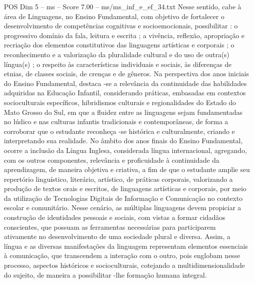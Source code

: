 \begin{textsample}{POS Dim 5 – ms – Score 7.00 – ms/ms\_inf\_e\_ef\_34.txt}
Nesse sentido, cabe à área de Linguagens, no Ensino Fundamental, com objetivo de fortalecer o desenvolvimento de competências cognitivas e socioemocionais, possibilitar : o progressivo domínio da fala, leitura e escrita ; a vivência, reflexão, apropriação e recriação dos elementos constitutivos das linguagens artísticas e corporais ; o reconhecimento e a valorização da pluralidade cultural e do uso de outra(s) língua(s) ; o respeito às características individuais e sociais, às diferenças de etnias, de classes sociais, de crenças e de gêneros.
Na perspectiva dos anos iniciais do Ensino Fundamental, destaca -se a relevância da continuidade das habilidades adquiridas na Educação Infantil, considerando práticas, embasadas em contextos socioculturais específicos, hibridismos culturais e regionalidades do Estado do Mato Grosso do Sul, em que a fluidez entre as linguagens sejam fundamentadas no lúdico e nas culturas infantis tradicionais e contemporâneas, de forma a corroborar que o estudante reconheça -se histórica e culturalmente, criando e interpretando sua realidade.
No âmbito dos anos finais do Ensino Fundamental, ocorre a inclusão da Língua Inglesa, considerada língua internacional, agregando, com os outros componentes, relevância e proficuidade à continuidade da aprendizagem, de maneira objetiva e criativa, a fim de que o estudante amplie seu repertório linguístico, literário, artístico, de práticas corporais, valorizando a produção de textos orais e escritos, de linguagens artísticas e corporais, por meio da utilização de Tecnologias Digitais de Informação e Comunicação no contexto escolar e comunitário.
Nesse cenário, as múltiplas linguagens devem propiciar a construção de identidades pessoais e sociais, com vistas a formar cidadãos conscientes, que possuam as ferramentas necessárias para participarem ativamente no desenvolvimento de uma sociedade plural e diversa.
Assim, a língua e as diversas manifestações da linguagem representam elementos essenciais à comunicação, que transcendem a interação com o outro, pois englobam nesse processo, aspectos históricos e socioculturais, cotejando a multidimensionalidade do sujeito, de maneira a possibilitar -lhe formação humana integral.

\end{textsample}
